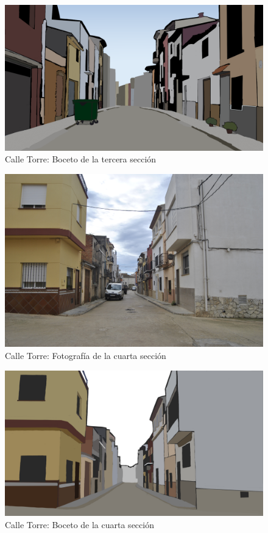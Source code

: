 \documentclass[12pt]{article}
\begin{document}
    \begin{figure}[h!]
        \centering
        \includegraphics[width=\textwidth]{imgs/c_torre_3.png}
        \caption{Calle Torre: Boceto de la tercera sección}
        \label{fig:torre_boceto_3}
    \end{figure}
    \clearpage
    \begin{figure}[h!]
        \centering
        \includegraphics[width=\textwidth]{imgs/C_torre_foto_3.JPG}
        \caption{Calle Torre: Fotografía de la cuarta sección}
        \label{fig:torre_foto_4}
    \end{figure}

    \begin{figure}[h!]
        \centering
        \includegraphics[width=\textwidth]{imgs/c_torre_4.png}
        \caption{Calle Torre: Boceto de la cuarta sección}
        \label{fig:torre_boceto_4}
    \end{figure}
\end{document}
